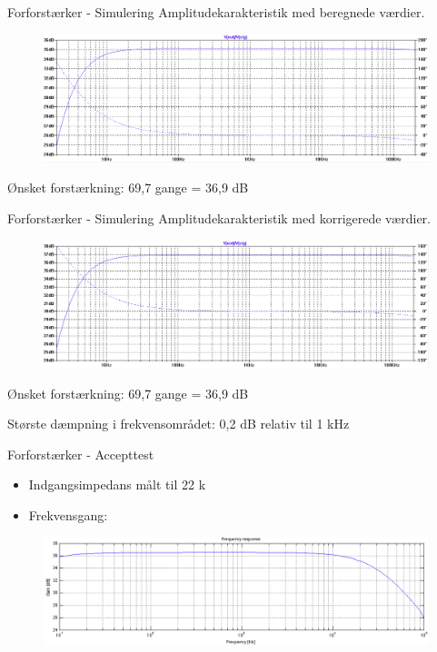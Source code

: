 \begin{frame}{Forforstærker - Simulering}
Amplitudekarakteristik med beregnede værdier.
\begin{figure}[h]
\centering
\includegraphics[scale=.23]{images/amplitudeforforstaerkerberegnet.png}
\end{figure}

Ønsket forstærkning: 69,7 gange = 36,9 dB
\end{frame}

\begin{frame}{Forforstærker - Simulering}
Amplitudekarakteristik med korrigerede værdier.
\begin{figure}[h]
\centering
\includegraphics[scale=.23]{images/amplitudeforforstaerkerkorrigeret.png}
\end{figure}
Ønsket forstærkning: 69,7 gange = 36,9 dB

Største dæmpning i frekvensområdet: 0,2 dB relativ til 1 kHz

\end{frame}


\begin{frame}{Forforstærker - Accepttest}
\begin{itemize}
\item Indgangsimpedans målt til 22 k\ohm
\item Frekvensgang: 
\end{itemize}
\begin{figure}[h]
\centering
\includegraphics[scale=.25]{images/frekvensrespons-forforstaerker.png}
\end{figure}

\end{frame}


